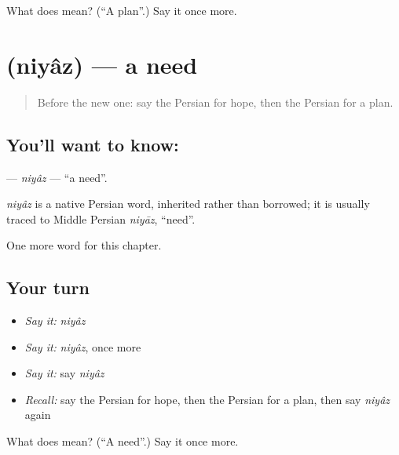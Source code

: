 \begin{tcolorbox}[breakable,colback=teal!4,colframe=teal!35!black,title={Before you move on}]
What does  mean? (\textquotedblleft{}A plan\textquotedblright{}.) Say it once more.
\end{tcolorbox}
\section[\texorpdfstring{\fa{نیاز} (niyâz)}{نیاز (niyâz)}]{ (niyâz) — a need}

\label{lesson:FA-C91-niyaz}



\begin{quote}
Before the new one: say the Persian for hope, then the Persian for a plan.
\end{quote}

\subsection*{You'll want to know: }
\textbf{} — \emph{niyâz} — \textquotedblleft{}a need\textquotedblright{}.

\begin{cousinweb}
\emph{niyâz} is a native Persian word, inherited rather than borrowed; it is usually traced to Middle Persian \emph{niyāz}, \textquotedblleft{}need\textquotedblright{}.
\end{cousinweb}

\begin{grammarlens}[title={What you've built}]
One more word for this chapter.
\end{grammarlens}

\subsection*{Your turn}
\begin{itemize}
\raggedright
  \item \emph{Say it:} \emph{niyâz}
  \item \emph{Say it:} \emph{niyâz}, once more
  \item \emph{Say it:} say \emph{niyâz}
  \item \emph{Recall:} say the Persian for hope, then the Persian for a plan, then say \emph{niyâz} again
\end{itemize}

\begin{tcolorbox}[breakable,colback=teal!4,colframe=teal!35!black,title={Before you move on}]
What does  mean? (\textquotedblleft{}A need\textquotedblright{}.) Say it once more.
\end{tcolorbox}
